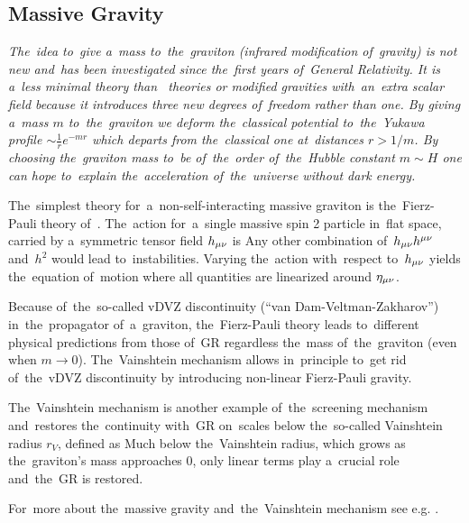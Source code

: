 \subsection{Massive Gravity}
{\itshape
The~idea to~give a~mass to~the~graviton (infrared modification of~gravity) is not new and~has been investigated since the~first years of~General Relativity. It is a~less minimal theory than \fR\ theories or modified gravities with~an~extra scalar field because it introduces three new degrees of~freedom rather than one. By giving a~mass $m$ to~the~graviton we deform the~classical potential to~the~Yukawa profile $\sim\frac1r e^{-mr}$ which departs from the~classical one at~distances $r>1/m$. By choosing the~graviton mass to~be of~the~order of~the~Hubble constant $m\sim H$ one can hope to~explain the~acceleration of~the~universe without dark energy.

The~simplest theory for~a~non-self-interacting massive graviton is the~Fierz-Pauli theory of~\textcite{1939RSPSA.173..211F}. The~action for~a~single massive spin 2 particle in~flat space, carried by a~symmetric tensor field $h_{\mu\nu}$ is
Any other combination of~$h_{\mu\nu} h^{\mu\nu}$ and~$h^2$ would lead to~instabilities. Varying the~action with~respect to~$h_{\mu\nu}$ yields the~equation of~motion
where all quantities are linearized around $\eta_{\mu\nu}$.

Because of~the~so-called vDVZ discontinuity (``van Dam-Veltman-Zakharov'') in~the~propagator of~a~graviton, the~Fierz-Pauli theory leads to~different physical predictions from those of~GR regardless the~mass of~the~graviton (even when $m\to0$). The~Vainshtein mechanism \parencite{1972PhLB...39..393V} allows in~principle to~get rid of~the~vDVZ discontinuity by introducing non-linear Fierz-Pauli gravity.

The~Vainshtein mechanism is another example of~the~screening mechanism and~restores the~continuity with~GR on~scales below the~so-called Vainshtein radius $r_V$, defined as
Much below the~Vainshtein radius, which grows as the~graviton's mass approaches $0$, only linear terms play a~crucial role and~the~GR is restored.

For~more about the~massive gravity and~the~Vainshtein mechanism see e.g. \textcite{2013CQGra..30r4001B,2012RvMP...84..671H}.
} 
